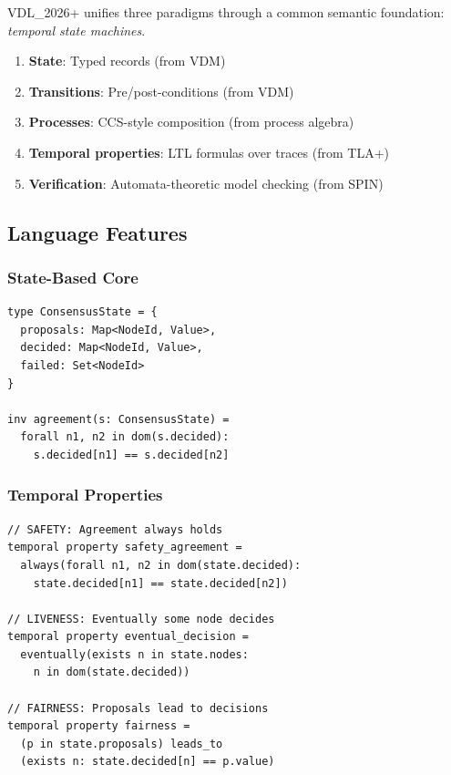 \documentclass[conference]{IEEEtran}
\begin{document}
VDL\_2026+ unifies three paradigms through a common semantic foundation: \textit{temporal state machines}.

\begin{enumerate}
\item \textbf{State}: Typed records (from VDM)
\item \textbf{Transitions}: Pre/post-conditions (from VDM)
\item \textbf{Processes}: CCS-style composition (from process algebra)
\item \textbf{Temporal properties}: LTL formulas over traces (from TLA+)
\item \textbf{Verification}: Automata-theoretic model checking (from SPIN)
\end{enumerate}

\subsection{Language Features}

\subsubsection{State-Based Core}

\begin{lstlisting}[caption={State and invariants}]
type ConsensusState = {
  proposals: Map<NodeId, Value>,
  decided: Map<NodeId, Value>,
  failed: Set<NodeId>
}

inv agreement(s: ConsensusState) =
  forall n1, n2 in dom(s.decided):
    s.decided[n1] == s.decided[n2]
\end{lstlisting}

\subsubsection{Temporal Properties}

\begin{lstlisting}[caption={Temporal logic operators}]
// SAFETY: Agreement always holds
temporal property safety_agreement =
  always(forall n1, n2 in dom(state.decided):
    state.decided[n1] == state.decided[n2])

// LIVENESS: Eventually some node decides
temporal property eventual_decision =
  eventually(exists n in state.nodes:
    n in dom(state.decided))

// FAIRNESS: Proposals lead to decisions
temporal property fairness =
  (p in state.proposals) leads_to
  (exists n: state.decided[n] == p.value)
\end{lstlisting}
\end{document}

